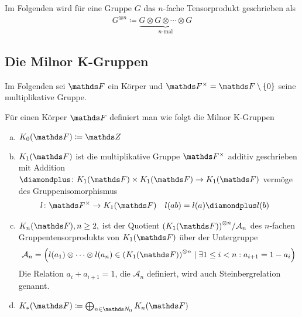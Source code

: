 \documentclass[ngerman,fontsize=11pt, paper=a4, parskip=half, titlepage=true, toc=bib]{scrartcl}
\begin{document}
\begin{Bem}[Gruppentensorprodukt]
  Im Folgenden wird für eine Gruppe $G$ das $n$-fache Tensorprodukt
  geschrieben als
  \begin{gather*}
    G^{\otimes n}
    \coloneqq \underbrace{G\otimes G\otimes\dotsb\otimes G}_{n\text{-mal}}
  \end{gather*}
\end{Bem}

\subsection{Die Milnor K-Gruppen}
Im Folgenden sei $\F$ ein Körper und $\Fx=\F\setminus \{0\}$ seine
multiplikative Gruppe.

\begin{Def}[$\KF$]\label{defkf}
  Für einen Körper $\F$ definiert man wie folgt die Milnor K-Gruppen
  \begin{enumerate}[a)]
  \item $\K_0(\F)\coloneqq \Z$
  \item $\K_1(\F)$ ist die multiplikative Gruppe $\Fx$ 
    additiv geschrieben mit Addition $\p\colon \KoF\times\KoF\to\KoF$
    vermöge des Gruppenisomorphismus 
    \begin{align*}
      l\colon \Fx&\to \K_1(\F)&
      l(ab)&=l(a)\p l(b)
    \end{align*}
  \item $\KnF, n\geq 2,$ ist der Quotient 
    ${(\K_1(\F))}^{\otimes n}/\calA_n$
    des $n$-fachen Gruppentensorprodukts von $\K_1(\F)$ über der
    Untergruppe 
    \begin{gather*}
      \calA_n=\left( 
        l(a_1)\otimes\dotsb\otimes l(a_n)
        \in {(\K_1(\F))}^{\otimes n}
        \mid  %
        \exists 1\leq i < n : a_{i+1}=1-a_i 
      \right)
    \end{gather*}
    Die Relation $a_i+a_{i+1}=1$, die $\mathcal{A}_n$ definiert,
    wird auch Steinbergrelation genannt.
  \item $\KF\coloneqq \bigoplus_{n\in\N_0}\KnF$
  \end{enumerate}
\end{Def}
\end{document}
